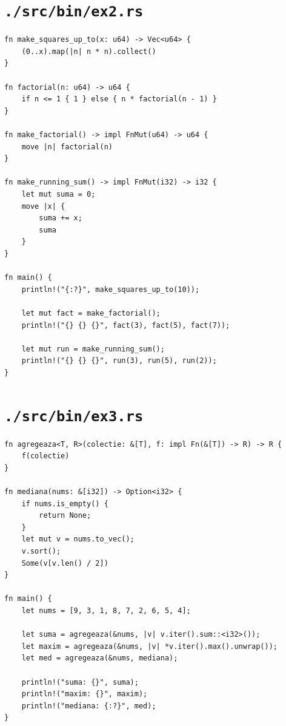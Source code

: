 \documentclass[11pt]{article}
\begin{document}
\section{\texttt{./src/bin/ex2.rs}}
\label{sec:org80a1376}
\begin{verbatim}
fn make_squares_up_to(x: u64) -> Vec<u64> {
    (0..x).map(|n| n * n).collect()
}

fn factorial(n: u64) -> u64 {
    if n <= 1 { 1 } else { n * factorial(n - 1) }
}

fn make_factorial() -> impl FnMut(u64) -> u64 {
    move |n| factorial(n)
}

fn make_running_sum() -> impl FnMut(i32) -> i32 {
    let mut suma = 0;
    move |x| {
        suma += x;
        suma
    }
}

fn main() {
    println!("{:?}", make_squares_up_to(10));

    let mut fact = make_factorial();
    println!("{} {} {}", fact(3), fact(5), fact(7));

    let mut run = make_running_sum();
    println!("{} {} {}", run(3), run(5), run(2));
}
\end{verbatim}
\section{\texttt{./src/bin/ex3.rs}}
\label{sec:orgb30c6de}
\begin{verbatim}
fn agregeaza<T, R>(colectie: &[T], f: impl Fn(&[T]) -> R) -> R {
    f(colectie)
}

fn mediana(nums: &[i32]) -> Option<i32> {
    if nums.is_empty() {
        return None;
    }
    let mut v = nums.to_vec();
    v.sort();
    Some(v[v.len() / 2])
}

fn main() {
    let nums = [9, 3, 1, 8, 7, 2, 6, 5, 4];

    let suma = agregeaza(&nums, |v| v.iter().sum::<i32>());
    let maxim = agregeaza(&nums, |v| *v.iter().max().unwrap());
    let med = agregeaza(&nums, mediana);

    println!("suma: {}", suma);
    println!("maxim: {}", maxim);
    println!("mediana: {:?}", med);
}
\end{verbatim}
\end{document}
